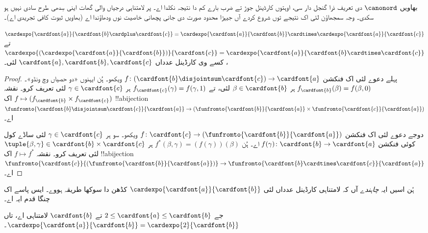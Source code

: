 \documentclass[../../../include/open-logic-section]{subfiles}
\begin{document}


بھاویں $\canonord$ دی تعریف ذرا گنجل دار سی، اوہتوں کارڈینل جوڑ تے ضرب بارے کم دا نتیجہ  نکلدا اے۔ پر لامتناہی درجیاں والی گھات اینی سِدھی طرح سادی نہیں ہو سکدی۔ وجہ سمجھاؤن لئی اک نتیجے توں شروع کردے آں جیہڑا محدود صورت دی جانی پچھانی خاصیت نوں ودھاؤندا اے (بھاویں ثبوت کافی تجریدی اے)۔

\begin{prop}
$\cardexpo{\cardfont{a}}{\cardfont{b} \cardplus \cardfont{c}} =
\cardexpo{\cardfont{a}}{\cardfont{b}} \cardtimes
\cardexpo{\cardfont{a}}{\cardfont{c}}$ تے
$\cardexpo{(\cardexpo{\cardfont{a}}{\cardfont{b}})}{\cardfont{c}} =
\cardexpo{\cardfont{a}}{\cardfont{b} \cardtimes \cardfont{c}}$،
کسے وی کارڈینل عدداں $\cardfont{a}, \cardfont{b}, \cardfont{c}$ لئی۔
\end{prop}

\begin{proof}
پہلے دعوے لئی اک فنکشن $f \colon
(\cardfont{b}\disjointsum\cardfont{c}) \to \cardfont{a}$ ویکھو۔ ہُن ایہنوں «دو حصیاں وچ ونڈو»۔ $f_\cardfont{b}(\beta) = f(\beta, 0)$ ہر $\beta \in \cardfont{b}$ لئی، تے $f_\cardfont{c}(\gamma) = f(\gamma, 1)$ ہر $\gamma \in \cardfont{c}$ لئی تعریف کرو۔ نقشہ $f \mapsto
(f_{\cardfont{b}} \times f_\cardfont{c})$ اک !!a{bijection}
$\funfromto{\cardfont{b} \disjointsum \cardfont{c}}{\cardfont{a}} \to
(\funfromto{\cardfont{b}}{\cardfont{a}} \times
\funfromto{\cardfont{c}}{\cardfont{a}})$ اے۔

دوجے دعوے لئی اک فنکشن $f \colon \cardfont{c} \to
(\funfromto{\cardfont{b}}{\cardfont{a}})$ ویکھو۔ سو ہر $\gamma \in
\cardfont{c}$ لئی ساڈے کول کوئی فنکشن $f(\gamma) \colon \cardfont{b} \to
\cardfont{a}$ اے۔ ہُن $f^*(\beta, \gamma) = (f(\gamma))(\beta)$ ہر
$\tuple{\beta, \gamma} \in \cardfont{b} \times \cardfont{c}$ لئی تعریف کرو۔ نقشہ $f \mapsto f^*$ اک !!a{bijection}
$\funfromto{\cardfont{c}}{(\funfromto{\cardfont{b}}{\cardfont{a}})}
\to \funfromto{\cardfont{b} \cardtimes \cardfont{c}}{\cardfont{a}}$ اے۔
\end{proof}

ہُن اسیں ایہ \emph{چاہندے} آں کہ لامتناہی کارڈینل عدداں لئی
$\cardexpo{\cardfont{a}}{\cardfont{b}}$ کڈھن دا سوکھا طریقہ ہووے۔ ایس پاسے اک چنگا قدم ایہ اے۔

\begin{prop}
جے $2 \leq \cardfont{a} \leq \cardfont{b}$ تے $\cardfont{b}$ لامتناہی اے، تاں $\cardexpo{\cardfont{a}}{\cardfont{b}} =
\cardexpo{2}{\cardfont{b}}$۔
\end{prop}
\end{document}
